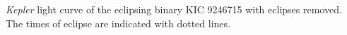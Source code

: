 \label{fig:lcfig2} \emph{Kepler} light curve of the eclipsing binary KIC 9246715 with eclipses removed. The times of eclipse are indicated with dotted lines.
